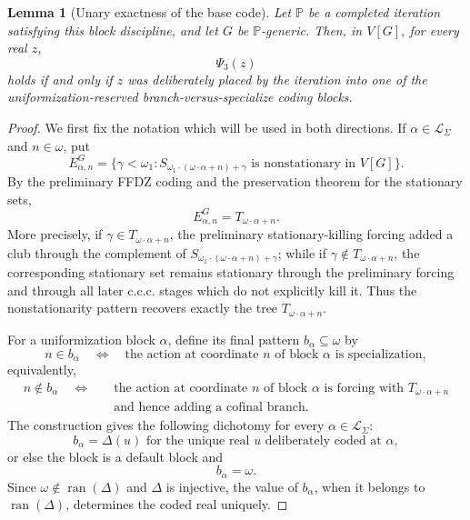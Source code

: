 \documentclass[11pt]{article}
\theoremstyle{plain}
\newtheorem{lemma}[theorem]{Lemma}
\theoremstyle{definition}
\theoremstyle{remark}
\newcommand{\Pp}{\mathbb P}
\newcommand{\PsiThree}{\Psi_{3}}
\begin{document}
\begin{lemma}[Unary exactness of the base code]\label{lem:block-correctness}
Let $\Pp$ be a completed iteration satisfying this block discipline, and let $G$ be
$\Pp$-generic.  Then, in $V[G]$, for every real $z$,
\[
\PsiThree(z)
\]
holds if and only if $z$ was deliberately placed by the iteration into one of the
uniformization-reserved branch-versus-specialize coding blocks.
\end{lemma}

\begin{proof}
We first fix the notation which will be used in both directions.  If
$\alpha\in\mathcal L_{\Sigma}$ and $n\in\omega$, put
\[
E^G_{\alpha,n}=\{\gamma<\omega_1:
S_{\omega_1\cdot(\omega\cdot\alpha+n)+\gamma}\text{ is nonstationary in }V[G]\}.
\]
By the preliminary FFDZ coding and the preservation theorem for the stationary sets,
\[
E^G_{\alpha,n}=T_{\omega\cdot\alpha+n}.                 \tag{1}
\]
More precisely, if $\gamma\in T_{\omega\cdot\alpha+n}$, the preliminary stationary-killing
forcing added a club through the complement of
$S_{\omega_1\cdot(\omega\cdot\alpha+n)+\gamma}$; while if
$\gamma\notin T_{\omega\cdot\alpha+n}$, the corresponding stationary set remains
stationary through the preliminary forcing and through all later c.c.c. stages which do
not explicitly kill it.  Thus the nonstationarity pattern recovers exactly the tree
$T_{\omega\cdot\alpha+n}$.

For a uniformization block $\alpha$, define its final pattern $b_\alpha\subseteq\omega$ by
\[
n\in b_\alpha
\quad\Longleftrightarrow\quad
\text{the action at coordinate }n\text{ of block }\alpha\text{ is specialization},
\]
equivalently,
\begin{align*}
   n\notin b_\alpha
\quad\Longleftrightarrow& \quad
\text{the action at coordinate }n\text{ of block }\alpha\text{ is forcing with }
T_{\omega\cdot\alpha+n} \\& \quad \text{and hence adding a cofinal branch}. 
\end{align*}
The construction gives the following dichotomy for every $\alpha\in\mathcal L_{\Sigma}$:
\[
b_\alpha=\Delta(u)\text{ for the unique real }u\text{ deliberately coded at }
\alpha,                                      \tag{2a}
\]
or else the block is a default block and
\[
b_\alpha=\omega.                             \tag{2b}
\]
Since $\omega\notin\operatorname{ran}(\Delta)$ and $\Delta$ is injective, the value of
$b_\alpha$, when it belongs to $\operatorname{ran}(\Delta)$, determines the coded real
uniquely.


\end{proof}
\end{document}
